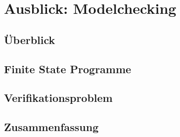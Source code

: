 \section{Ausblick: Modelchecking}

\subsection{Überblick}
\begin{frame}{\insertsubsection}
\end{frame}

\subsection{Finite State Programme}
\begin{frame}{\insertsubsection}
\end{frame}

\subsection{Verifikationsproblem}
\begin{frame}{\insertsubsection}
\end{frame}

\subsection{Zusammenfassung}
\begin{frame}{\insertsubsection}
\end{frame}
